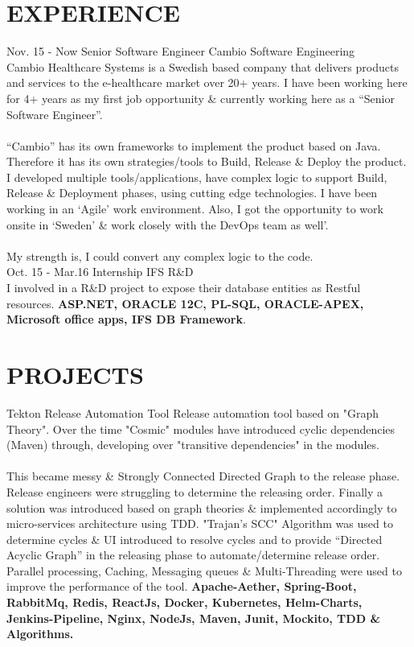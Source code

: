 \documentclass[]{cv-class}
\begin{document}
\section{EXPERIENCE}
\begin{entrylist}
  \entry
    {Nov. 15 - Now}
    {Senior Software Engineer}
    {Cambio Software Engineering}
    {   \\
        Cambio Healthcare Systems is a Swedish based company that delivers products and services to the e-healthcare market over 20+ years.
        I have been working here for 4+ years as my first job opportunity \& currently working here as a “Senior Software Engineer”.
        \\
        \\
        “Cambio” has its own frameworks to implement the product based on Java.
        Therefore it has its own strategies/tools to Build, Release \& Deploy the product.
        I developed multiple tools/applications, have complex logic to support Build, Release \& Deployment phases, using cutting edge technologies.
        I have been working in an ‘Agile’ work environment.
        Also, I got the opportunity to work onsite in ‘Sweden’ \& work closely with the DevOps team as well’.
        \\
        \\
        My strength is, I could convert any complex logic to the code.
    }
\\
  \entry
    {Oct. 15 - Mar.16}
    {Internship}
    {IFS R\&D}
    {   \\
        I involved in a R\&D project to expose their database entities as Restful resources.
        \textbf{ASP.NET, ORACLE 12C, PL-SQL, ORACLE-APEX, Microsoft office apps, IFS DB Framework}.
    }
\end{entrylist}

\section{PROJECTS}
\begin{entrylist}
    \entry
    {}
	{Tekton}
    {Release Automation Tool}
	{
	    Release automation tool based on "Graph Theory". Over the time "Cosmic" modules have introduced cyclic dependencies (Maven) through, developing over "transitive dependencies" in the modules.
	    \\
	    \\
	    This became messy \& Strongly Connected Directed Graph to the release phase. Release engineers were struggling to determine the releasing order. Finally a solution was introduced based on graph theories \& implemented accordingly to micro-services architecture using TDD.
	    "Trajan’s SCC" Algorithm was used to determine cycles \& UI introduced to resolve cycles and to provide “Directed Acyclic Graph”
	    in the releasing phase to automate/determine release order.
	    Parallel processing, Caching, Messaging queues \& Multi-Threading were used to improve the performance of the tool.
        \textbf{Apache-Aether, Spring-Boot, RabbitMq, Redis, ReactJs, Docker, Kubernetes, Helm-Charts, Jenkins-Pipeline, Nginx, NodeJs, Maven, Junit, Mockito, TDD \& Algorithms.}
	}
	\\
	\end{entrylist}
\end{document}
